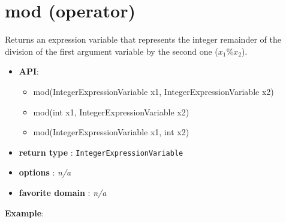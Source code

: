 
\section{mod (operator)}\label{mod:modoperator}\hypertarget{mod:modoperator}{}
Returns an expression variable that represents the integer remainder of the division of the first argument variable by the second one (\(x_1\%x_2\)).

\begin{itemize}
	\item \textbf{API}:
	\begin{itemize}
		\item mod(IntegerExpressionVariable x1, IntegerExpressionVariable x2)
		\item mod(int x1, IntegerExpressionVariable x2)
		\item mod(IntegerExpressionVariable x1, int x2)
	\end{itemize}
	\item \textbf{return type} : \texttt{IntegerExpressionVariable}
	\item \textbf{options} : \emph{n/a}
	\item \textbf{favorite domain} : \emph{n/a}
\end{itemize}

\textbf{Example}:


